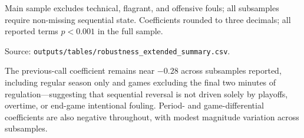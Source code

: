 \begin{table}[htbp]

\centering

\caption{Robustness: sequential logit coefficients by subsample}

\label{tab:robustness}

\small

\begin{threeparttable}


\begin{tablenotes}[flushleft]

\small

\item[] Main sample excludes technical, flagrant, and offensive fouls; all subsamples require non-missing sequential state. Coefficients rounded to three decimals; all reported terms $p<0.001$ in the full sample.

\item[] Source: \texttt{outputs/tables/robustness\_extended\_summary.csv}.

\end{tablenotes}

\end{threeparttable}

\end{table}



The previous-call coefficient remains near $-0.28$ across subsamples reported, including regular season only and games excluding the final two minutes of regulation---suggesting that sequential reversal is not driven solely by playoffs, overtime, or end-game intentional fouling. Period- and game-differential coefficients are also negative throughout, with modest magnitude variation across subsamples.

